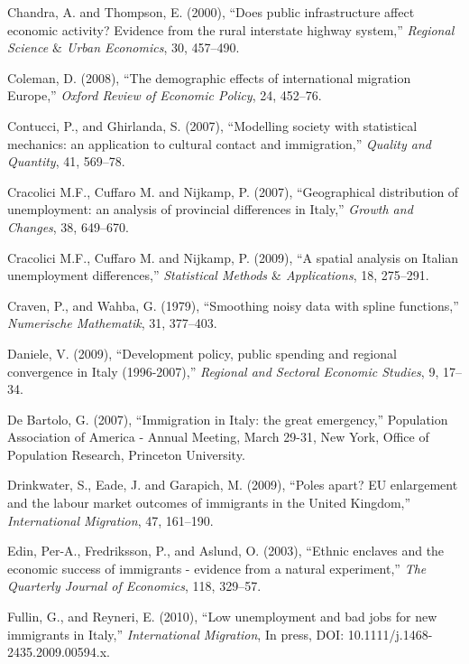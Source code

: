 \documentclass[10pt]{article}
\theoremstyle{definition}
\theoremstyle{plain}
\begin{document}
\begin{thebibliography}{99}
\bibitem{} Chandra, A. and Thompson, E. (2000), ``Does public infrastructure affect economic activity? Evidence from the rural interstate highway system,'' \textit{Regional Science $\&$ Urban Economics}, 30, 457--490.


\bibitem{} Coleman, D. (2008), ``The demographic effects of international migration Europe,'' \textit{Oxford Review of Economic Policy}, 24, 452--76.

\bibitem{} Contucci, P., and Ghirlanda, S. (2007), ``Modelling society with statistical mechanics: an application to cultural contact and immigration,'' \textit{Quality and Quantity}, 41, 569--78.

\bibitem{} Cracolici M.F., Cuffaro M. and Nijkamp, P. (2007), ``Geographical distribution of unemployment: an analysis of provincial differences in Italy,'' \textit{Growth and Changes}, 38, 649--670.

\bibitem{} Cracolici M.F., Cuffaro M. and Nijkamp, P. (2009), ``A spatial analysis on Italian unemployment differences,'' \textit{Statistical Methods $\&$ Applications}, 18, 275--291.

\bibitem{} Craven, P., and Wahba, G. (1979), ``Smoothing noisy data with spline functions,'' \textit{Numerische Mathematik}, 31, 377--403.

\bibitem{} Daniele, V. (2009), ``Development policy, public spending and regional convergence in Italy (1996-2007),'' \textit{Regional and Sectoral Economic Studies}, 9, 17--34.

\bibitem{} De Bartolo, G. (2007), ``Immigration in Italy: the great emergency,'' Population Association of America - Annual Meeting, March 29-31, New York, Office of Population Research, Princeton University.

\bibitem{} Drinkwater, S., Eade, J. and Garapich, M. (2009), ``Poles apart? EU enlargement and the labour market outcomes of immigrants in the United Kingdom,'' \textit{International Migration}, 47, 161--190.

\bibitem{} Edin, Per-A., Fredriksson, P., and Aslund, O. (2003), ``Ethnic enclaves and the economic success of immigrants - evidence from a natural experiment,'' \textit{The Quarterly Journal of Economics}, 118, 329--57.

\bibitem{} Fullin, G., and Reyneri, E. (2010), ``Low unemployment and bad jobs for new immigrants in Italy,'' \textit{International Migration}, In press, DOI: 10.1111/j.1468-2435.2009.00594.x.


\end{thebibliography}
\end{document}
